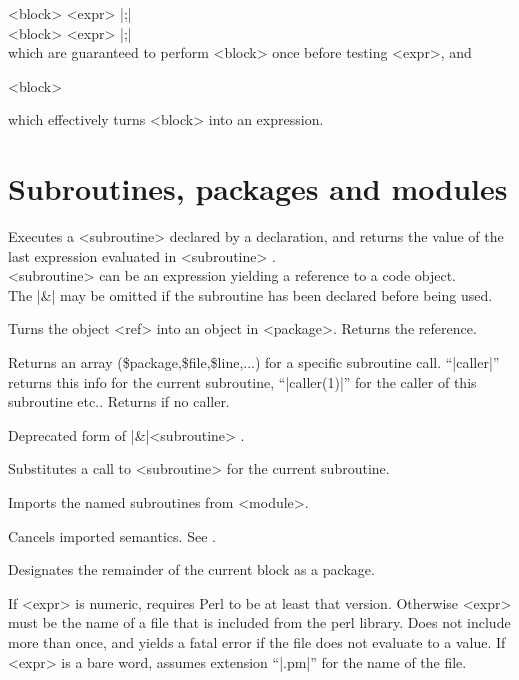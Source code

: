 \quad	{} <block>  <expr> |;| \\
\quad	{} <block>  <expr> |;| \\

which are guaranteed to perform <block> once before testing <expr>, and

\quad	{} <block>

which effectively turns <block> into an expression.


\section{Subroutines, packages and modules} 

\begin{enum}{1cm}

Executes a <subroutine> declared by a  declaration, and
returns the value of the last expression evaluated in <subroutine> .
\\
<subroutine> can be an expression yielding a reference to a code object.
\\
The |&| may be omitted if the subroutine has been declared 
before being used.

Turns the object <ref> into an object in <package>.
Returns the reference.\ddag

Returns an array (\$package,\$file,\$line,...) for a specific subroutine
call. ``|caller|'' returns this info for the current subroutine,
``|caller(1)|'' for the caller of this subroutine etc..  
Returns \false{} if no caller.

Deprecated form of |&|<subroutine> .

Substitutes a call to <subroutine> for the current subroutine.

Imports the named subroutines from <module>.\ddag

Cancels imported semantics. See .\ddag

Designates the remainder of the current block as a package.

If <expr> is numeric, requires Perl to be at least that version.
Otherwise <expr> must be the name of a file that is included from
the perl library. Does not include
more than once, and yields a fatal error if the file does not evaluate
to a \true{} value.
\newline If <expr> is a bare word, assumes extension ``|.pm|''
for the name of the file.


\end{enum}
